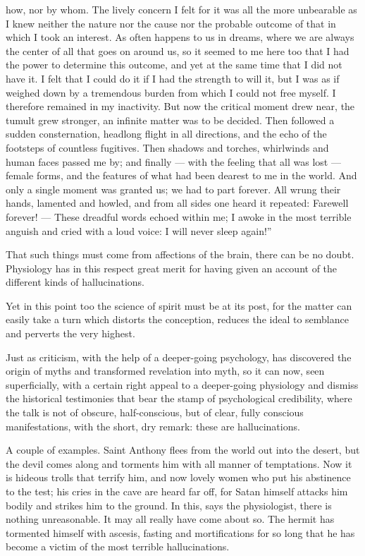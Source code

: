 \documentclass[12pt,a4paper,openany]{book}
\newcommand{\opage}[1]{\marginnote{\footnotesize\textit{[#1]}}}
\begin{document}
\opage{82}how, nor by whom. The lively concern I felt for it was all the more unbearable as I knew neither the nature nor the cause nor the probable outcome of that in which I took an interest. As often happens to us in dreams, where we are always the center of all that goes on around us, so it seemed to me here too that I had the power to determine this outcome, and yet at the same time that I did not have it. I felt that I could do it if I had the strength to will it, but I was as if weighed down by a tremendous burden from which I could not free myself. I therefore remained in my inactivity. But now the critical moment drew near, the tumult grew stronger, an infinite matter was to be decided. Then followed a sudden consternation, headlong flight in all directions, and the echo of the footsteps of countless fugitives. Then shadows and torches, whirlwinds and human faces passed me by; and finally --- with the feeling that all was lost --- female forms, and the features of what had been dearest to me in the world. And only a single moment was granted us; we had to part forever. All wrung their hands, lamented and howled, and from all sides one heard it repeated: Farewell forever! --- These dreadful words echoed within me; I awoke in the most terrible anguish and cried with a loud voice: I will never sleep again!''

That such things must come from affections of the brain, there can be no doubt. Physiology has in this respect great merit for having given an account of the different kinds of hallucinations.

Yet in this point too the science of spirit must be at its post, for the matter can easily take a turn which
\setcounter{footnote}{0}%
\opage{83}distorts the conception, reduces the ideal to semblance and perverts the very highest.

Just as criticism, with the help of a deeper-going psychology, has discovered the origin of myths and transformed revelation into myth, so it can now, seen superficially, with a certain right appeal to a deeper-going physiology and dismiss the historical testimonies that bear the stamp of psychological credibility, where the talk is not of obscure, half-conscious, but of clear, fully conscious manifestations, with the short, dry remark: these are hallucinations.

A couple of examples. Saint Anthony flees from the world out into the desert, but the devil comes along and torments him with all manner of temptations. Now it is hideous trolls that terrify him, and now lovely women who put his abstinence to the test; his cries in the cave are heard far off, for Satan himself attacks him bodily and strikes him to the ground. In this, says the physiologist, there is nothing unreasonable. It may all really have come about so. The hermit has tormented himself with ascesis, fasting and mortifications for so long that he has become a victim of the most terrible hallucinations.
\end{document}
